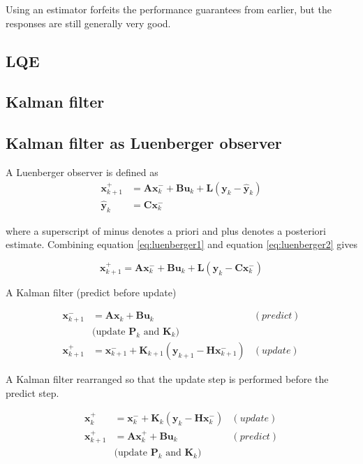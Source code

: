 \documentclass[10pt,conference,compsoc]{IEEEtran}
\newcommand{\mtx}[1] {\bm #1}
\begin{document}
\noindent Using an estimator forfeits the performance guarantees from earlier,
but the responses are still generally very good.

\subsection{LQE}

\subsection{Kalman filter}

\subsection{Kalman filter as Luenberger observer}

\noindent A Luenberger observer is defined as
\begin{align}
  \mtx{x}_{k+1}^+ &= \mtx{A} \mtx{x}_k^- + \mtx{B} \mtx{u}_k + \mtx{L}
    (\mtx{y}_k - \hat{\mtx{y}}_k) \label{eq:luenberger1} \\
  \hat{\mtx{y}}_k &= \mtx{C} \mtx{x}_k^- \label{eq:luenberger2}
\end{align}

\noindent where a superscript of minus denotes a priori and plus denotes a
posteriori estimate. Combining equation \ref{eq:luenberger1} and equation
\ref{eq:luenberger2} gives

\begin{equation}
  \mtx{x}_{k+1}^+ = \mtx{A} \mtx{x}_k^- + \mtx{B} \mtx{u}_k + \mtx{L}
    (\mtx{y}_k - \mtx{C} \mtx{x}_k^-) \label{eq:luenberger}
\end{equation}

\noindent A Kalman filter (predict before update)

\begin{align}
  \mtx{x}_{k+1}^- &= \mtx{A} \mtx{x}_k + \mtx{B} \mtx{u}_k \label{eq:p_u1} &
    (predict) \\
  &\text{(update $\mtx{P}_k$ and $\mtx{K}_k$)} \nonumber \\
  \mtx{x}_{k+1}^+ &= \mtx{x}_{k+1}^- + \mtx{K}_{k+1} (\mtx{y}_{k+1} -
    \mtx{H} \mtx{x}_{k+1}^-) \label{eq:p_u2} & (update)
\end{align}

\noindent A Kalman filter rearranged so that the update step is performed before
the predict step.

\begin{align}
  \mtx{x}_k^+ &= \mtx{x}_k^- +
    \mtx{K}_k (\mtx{y}_k - \mtx{H} \mtx{x}_k^-) \label{eq:u_p1} & (update) \\
  \mtx{x}_{k+1}^+ &= \mtx{A} \mtx{x}_k^+ + \mtx{B} \mtx{u}_k \label{eq:u_p2} &
    (predict) \\
  &\text{(update $\mtx{P}_k$ and $\mtx{K}_k$)} \nonumber
\end{align}
\end{document}
